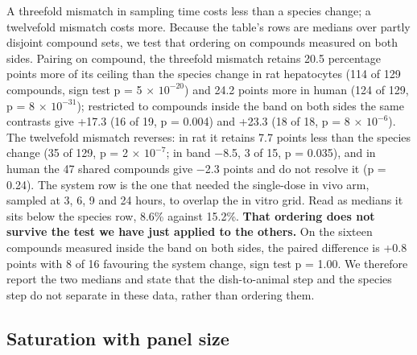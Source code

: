 \documentclass[11pt,a4paper]{article}
\begin{document}
A threefold mismatch in sampling time costs less than a species change;
a twelvefold mismatch costs more. Because the table's rows are medians
over partly disjoint compound sets, we test that ordering on compounds
measured on both sides. Pairing on compound, the threefold mismatch
retains 20.5 percentage points more of its ceiling than the species
change in rat hepatocytes (114 of 129 compounds, sign test p = 5 ×
\ensuremath{10^{-20}}) and 24.2 points more in human (124 of 129, p = 8 × \ensuremath{10^{-31}});
restricted to compounds inside the band on both sides the same contrasts
give +17.3 (16 of 19, p = 0.004) and +23.3 (18 of 18, p = 8 × \ensuremath{10^{-6}}). The
twelvefold mismatch reverses: in rat it retains 7.7 points less than the
species change (35 of 129, p = 2 × \ensuremath{10^{-7}}; in band −8.5, 3 of 15, p =
0.035), and in human the 47 shared compounds give −2.3 points and do not
resolve it (p = 0.24). The system row is the one that needed the
single-dose in vivo arm, sampled at 3, 6, 9 and 24 hours, to overlap the
in vitro grid. Read as medians it sits below the species row, 8.6\%
against 15.2\%. \textbf{That ordering does not survive the test we have
just applied to the others.} On the sixteen compounds measured inside
the band on both sides, the paired difference is +0.8 points with 8 of
16 favouring the system change, sign test p = 1.00. We therefore report
the two medians and state that the dish-to-animal step and the species
step do not separate in these data, rather than ordering them.

\subsection{Saturation with panel
size}\label{saturation-with-panel-size}
\end{document}
